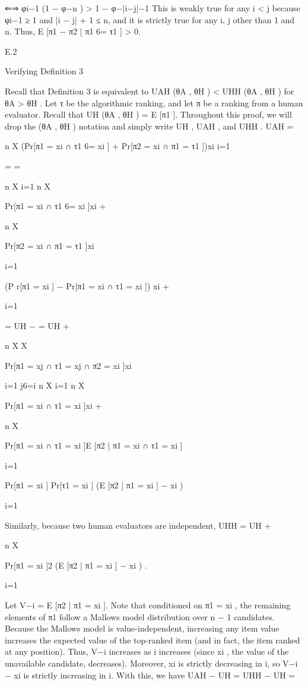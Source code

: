\documentclass[10pt]{article}
\begin{document}
\begin{ReviewVerbatim}
⇐⇒ φi−1 (1 − φ−n ) > 1 − φ−|i−j|−1
This is weakly true for any i < j because φi−1 ≥ 1 and |i − j| + 1 ≤ n, and it is strictly true for any i, j
other than 1 and n. Thus, E [π1 − π2 | π1 6= τ1 ] > 0.

E.2

Verifying Definition 3

Recall that Definition 3 is equivalent to UAH (θA , θH ) < UHH (θA , θH ) for θA > θH . Let τ be the algorithmic
ranking, and let π be a ranking from a human evaluator. Recall that UH (θA , θH ) = E [π1 ]. Throughout this
proof, we will drop the (θA , θH ) notation and simply write UH , UAH , and UHH .
UAH =

n
X
(Pr[π1 = xi ∩ τ1 6= xi ] + Pr[π2 = xi ∩ π1 = τ1 ])xi
i=1

=
=

n
X
i=1
n
X

Pr[π1 = xi ∩ τ1 6= xi ]xi +

n
X

Pr[π2 = xi ∩ π1 = τ1 ]xi

i=1

(P r[π1 = xi ] − Pr[π1 = xi ∩ τ1 = xi ]) xi +

i=1

= UH −
= UH +

n X
X

Pr[π1 = xj ∩ τ1 = xj ∩ π2 = xi ]xi

i=1 j6=i
n
X
i=1
n
X

Pr[π1 = xi ∩ τ1 = xi ]xi +

n
X

Pr[π1 = xi ∩ τ1 = xi ]E [π2 | π1 = xi ∩ τ1 = xi ]

i=1

Pr[π1 = xi ] Pr[τ1 = xi ] (E [π2 | π1 = xi ] − xi )

i=1

Similarly, because two human evaluators are independent,
UHH = UH +

n
X

Pr[π1 = xi ]2 (E [π2 | π1 = xi ] − xi ) .

i=1

Let V−i = E [π2 | π1 = xi ]. Note that conditioned on π1 = xi , the remaining elements of π1 follow a Mallows
model distribution over n − 1 candidates. Because the Mallows model is value-independent, increasing any
item value increases the expected value of the top-ranked item (and in fact, the item ranked at any position).
Thus, V−i increases as i increases (since xi , the value of the unavailable candidate, decreases). Moreover, xi
is strictly decreasing in i, so V−i − xi is strictly increasing in i. With this, we have
UAH − UH =
UHH − UH =


\end{ReviewVerbatim}
\end{document}
